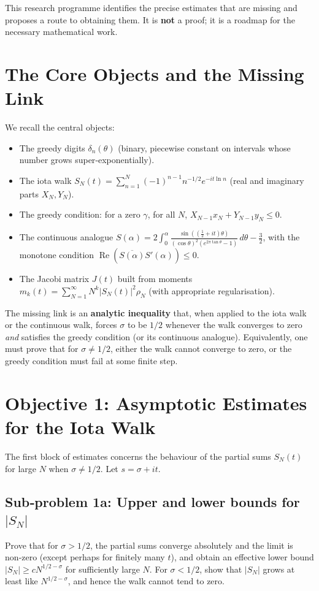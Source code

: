 \documentclass[11pt,a4paper]{article}
\begin{document}
This research programme identifies the precise estimates that are missing and proposes a route to obtaining them.  It is \textbf{not} a proof; it is a roadmap for the necessary mathematical work.

\section{The Core Objects and the Missing Link}
\label{sec:core}

We recall the central objects:

\begin{itemize}
    \item The greedy digits $\delta_n(\theta)$ (binary, piecewise constant on intervals whose number grows super‑exponentially).
    \item The iota walk $S_N(t)=\sum_{n=1}^N (-1)^{n-1}n^{-1/2}e^{-it\ln n}$ (real and imaginary parts $X_N,Y_N$).
    \item The greedy condition: for a zero $\gamma$, for all $N$, $X_{N-1}x_N+Y_{N-1}y_N\le 0$.
    \item The continuous analogue $S(\alpha) = 2\int_0^\alpha \frac{\sin((\frac12+it)\theta)}{(\cos\theta)^2(e^{2\pi\tan\theta}-1)}\,d\theta -\frac32$, with the monotone condition $\operatorname{Re}(\overline{S(\alpha)}S'(\alpha))\le0$.
    \item The Jacobi matrix $J(t)$ built from moments $m_k(t)=\sum_{N=1}^\infty N^k |S_N(t)|^2 \rho_N$ (with appropriate regularisation).
\end{itemize}

The missing link is an \textbf{analytic inequality} that, when applied to the iota walk or the continuous walk, forces $\sigma$ to be $1/2$ whenever the walk converges to zero \emph{and} satisfies the greedy condition (or its continuous analogue).  Equivalently, one must prove that for $\sigma\neq 1/2$, either the walk cannot converge to zero, or the greedy condition must fail at some finite step.

\section{Objective 1: Asymptotic Estimates for the Iota Walk}
\label{sec:asymp-iota}

The first block of estimates concerns the behaviour of the partial sums $S_N(t)$ for large $N$ when $\sigma\neq 1/2$.  Let $s=\sigma+it$.

\subsection{Sub‑problem 1a: Upper and lower bounds for $|S_N|$}
Prove that for $\sigma>1/2$, the partial sums converge absolutely and the limit is non‑zero (except perhaps for finitely many $t$), and obtain an effective lower bound $|S_N| \ge c N^{1/2-\sigma}$ for sufficiently large $N$.  For $\sigma<1/2$, show that $|S_N|$ grows at least like $N^{1/2-\sigma}$, and hence the walk cannot tend to zero.
\end{document}
